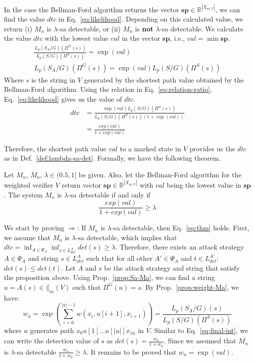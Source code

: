 In the case the Bellman-Ford algorithm returns the vector $\mathbf{sp}\in \mathbb{R}^{|X_{m,V}|}$, we can find the value $dtc$ in Eq.~\ref{eq:likelihood}.
Depending on this calculated value, we return (i) $M_n$ is $\lambda$-sa detectable, or (ii) $M_n$ is \textbf{not} $\lambda$-sa detectable.
We calculate the value $dtc$ with the lowest value $val$ in the vector $\mathbf{sp}$, i.e., $val = \min \textbf{sp}$.
\begin{align}
\frac{L_p(S_A/G)(\Pi^G(s))}{L_p(S/G)(\Pi^S(s))} = \exp(val)\nonumber\\
L_p(S_A/G)(\Pi^G(s)) = \exp(val)L_p(S/G)(\Pi^S(s))\label{eq:relation-ratio}
\end{align}
Where $s$ is the string in $V$ generated by the shortest path value obtained by the Bellman-Ford algorithm.
Using the relation in Eq.~\ref{eq:relation-ratio}, Eq.~\ref{eq:likelihood} gives us the value of $dtc$.
\begin{align}
dtc &= \frac{\exp(val)L_p(S/G)(\Pi^S(s))}{L_p(S/G)(\Pi^S(s))(1+\exp(val))}\nonumber \\
& =\frac{exp(val)}{1+exp(val)} \label{eq:final-int}
\end{align}

Therefore, the shortest path value $val$ to a marked state in $V$ provides us the $dtc$ as in Def.~\ref{def:lambda-sa-det}.
Formally, we have the following theorem.

\begin{theorem}\label{theo:vector-shortest}
Let $M_n$, $M_a$, $\lambda\in (0.5,1]$ be given.
Also, let the Bellman-Ford algorithm for the weighted verifier $V$ return vector $\mathbf{sp}\in \mathbb{R}^{|X_{m,V}|}$ with $val$ being the lowest value in $\mathbf{sp}$.
The system $M_n$ is $\lambda$-sa detectable if and only if 
\begin{equation}\label{eq:thm}
\frac{exp(val)}{1+exp(val)}\geq \lambda
\end{equation}
\end{theorem}

\proof \quad 
We start by proving $\Rightarrow$: If $M_n$ is $\lambda$-sa detectable, then Eq.~\ref{eq:thm} holds.
First, we assume that $M_n$ is  $\lambda$-sa detectable, which implies that $dtc = \inf_{A\in\Psi_A}\inf_{s\in L^A_{det}} det(s) \geq \lambda$.
Therefore, there exists an attack strategy $A\in \Psi_A$ and string $s\in L_{det}^A$ such that for all other $A'\in \Psi_A$ and $t\in L_{det}^{A'}$: $det(s)\leq det(t)$.
Let $A$ and $s$ be the attack strategy and string that satisfy the proposition above.
Using Prop.~\ref{prop:Sa-Ma}, we can find a string $u = A(s)\in \lang_m(V)$ such that $\Pi^G(u) = s$.
By Prop.~\ref{prop:weight-Ma}, we have: 
\begin{equation}\label{eq:w_u}
w_u = \exp\left(\sum_{i=0}^{|u|-1} w(x_i,u[i+1],x_{i+1})\right)  = \frac{L_p(S_A/G)(s)}{L_p(S/G)(\Pi^S(s))}
\end{equation}
where $u$ generates path $x_0u[1]\dots u[|u|]x_{|u|}$ in $V$.
Similar to Eq.~\ref{eq:final-int}, we can write the detection value of $s$ as $det(s) = \frac{w_u}{1+w_u}$.
Since we assumed that $M_n$ is $\lambda$-sa detectable $\frac{w_u}{1+w_u}\geq \lambda$.
It remains to be proved that $w_u = \exp(val)$.

